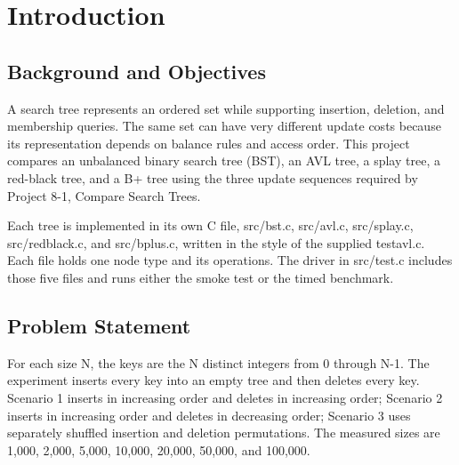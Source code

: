 \section{Introduction}

\subsection{Background and Objectives}

A search tree represents an ordered set while supporting insertion, deletion, and membership queries. The same set can have very different update costs because its representation depends on balance rules and access order. This project compares an unbalanced binary search tree (BST), an AVL tree, a splay tree, a red-black tree, and a B+ tree using the three update sequences required by Project 8-1, Compare Search Trees.

Each tree is implemented in its own C file, src/\allowbreak{}bst.c, src/\allowbreak{}avl.c, src/\allowbreak{}splay.c, src/\allowbreak{}redblack.c, and src/\allowbreak{}bplus.c, written in the style of the supplied testavl.c. Each file holds one node type and its operations. The driver in src/\allowbreak{}test.c includes those five files and runs either the smoke test or the timed benchmark.

\subsection{Problem Statement}

For each size N, the keys are the N distinct integers from 0 through N-1. The experiment inserts every key into an empty tree and then deletes every key. Scenario 1 inserts in increasing order and deletes in increasing order; Scenario 2 inserts in increasing order and deletes in decreasing order; Scenario 3 uses separately shuffled insertion and deletion permutations. The measured sizes are 1,000, 2,000, 5,000, 10,000, 20,000, 50,000, and 100,000.
